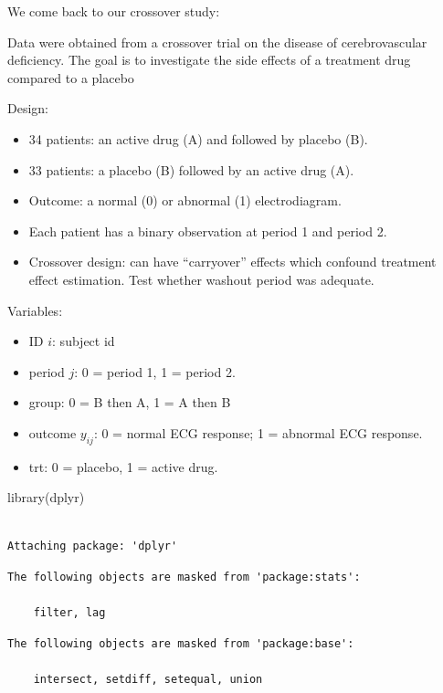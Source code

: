 \documentclass[
  letterpaper,
  DIV=11,
  numbers=noendperiod]{scrreprt}
\newenvironment{Shaded}{\begin{snugshade}}{\end{snugshade}}
\newcommand{\FunctionTok}[1]{\textcolor[rgb]{0.28,0.35,0.67}{#1}}
\newcommand{\NormalTok}[1]{\textcolor[rgb]{0.00,0.23,0.31}{#1}}
\begin{document}
We come back to our crossover study:

Data were obtained from a crossover trial on the disease of
cerebrovascular deficiency. The goal is to investigate the side effects
of a treatment drug compared to a placebo

Design:

\begin{itemize}
\item
  34 patients: an active drug (A) and followed by placebo (B).
\item
  33 patients: a placebo (B) followed by an active drug (A).
\item
  Outcome: a normal (0) or abnormal (1) electrodiagram.
\item
  Each patient has a binary observation at period 1 and period 2.
\item
  Crossover design: can have ``carryover'' effects which confound
  treatment effect estimation. Test whether washout period was adequate.
\end{itemize}

Variables:

\begin{itemize}
\item
  ID \(i\): subject id
\item
  period \(j\): 0 = period 1, 1 = period 2.
\item
  group: 0 = B then A, 1 = A then B
\item
  outcome \(y_{ij}\): 0 = normal ECG response; 1 = abnormal ECG
  response.
\item
  trt: 0 = placebo, 1 = active drug.
\end{itemize}

\begin{Shaded}
\begin{Highlighting}[]
\FunctionTok{library}\NormalTok{(dplyr)}
\end{Highlighting}
\end{Shaded}

\begin{verbatim}

Attaching package: 'dplyr'
\end{verbatim}

\begin{verbatim}
The following objects are masked from 'package:stats':

    filter, lag
\end{verbatim}

\begin{verbatim}
The following objects are masked from 'package:base':

    intersect, setdiff, setequal, union
\end{verbatim}
\end{document}
